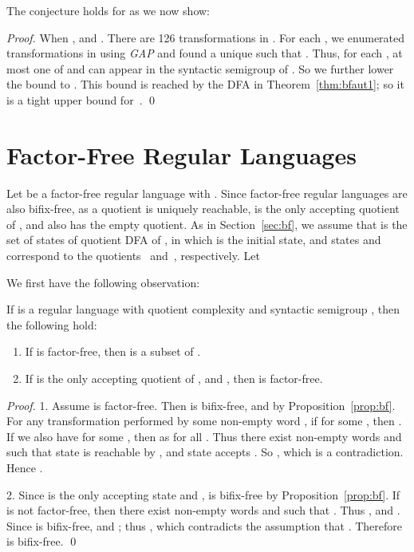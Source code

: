 \documentclass{llncs}
\newcommand{\be}{\begin{enumerate}}
\newcommand{\ee}{\end{enumerate}}
\begin{document}
\smallskip

The conjecture holds for  as we now show:
\begin{proof} 
When ,  and . There are 126 transformations  in . For each , we enumerated transformations in  using \emph{GAP} and found a unique  such that . Thus, for each , at most one of  and  can appear in the syntactic semigroup  of . So we further lower the bound to . This bound is reached by the DFA  in Theorem~\ref{thm:bfaut1}; so it is a tight upper bound for~. \qed
\end{proof}

\section{Factor-Free Regular Languages}\label{sec:ff}

Let  be a factor-free regular language with . Since factor-free regular languages are also bifix-free,  as a quotient is uniquely reachable,  is the only accepting quotient of , and  also has the empty quotient. As in Section~\ref{sec:bf}, we assume that  is the set of states of quotient DFA of , in which  is the initial state, and states  and  correspond to the quotients ~and~, respectively. Let 

We first have the following observation: 

\begin{proposition}\label{prop:ff}
If  is a regular language with quotient complexity  and syntactic semigroup , then the following hold: 
\be 
\item If  is factor-free, then  is a subset of . 
\item If  is the only accepting quotient of , and , then  is factor-free. 
\ee
\end{proposition}

\begin{proof}
1. Assume  is factor-free. Then  is bifix-free, and  by Proposition~\ref{prop:bf}. For any transformation  performed by some non-empty word , if  for some , then . If we also have  for some , then  as  for all . Thus there exist non-empty words  and  such that state  is reachable by , and state  accepts . So , which is a contradiction. Hence . 

2. Since  is the only accepting state and ,  is bifix-free by Proposition~\ref{prop:bf}. If  is not factor-free, then there exist non-empty words  and  such that . Thus , and . Since  is bifix-free,  and ; thus , which contradicts the assumption that . Therefore  is bifix-free. \qed
\end{proof}
\end{document}
